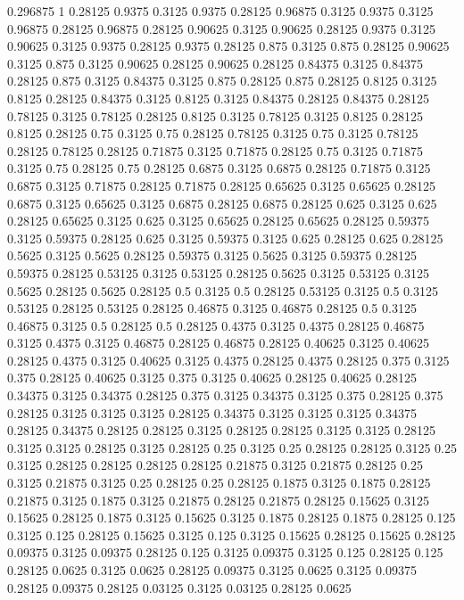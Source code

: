 0.296875 1
0.28125 0.9375
0.3125 0.9375
0.28125 0.96875
0.3125 0.9375
0.3125 0.96875
0.28125 0.96875
0.28125 0.90625
0.3125 0.90625
0.28125 0.9375
0.3125 0.90625
0.3125 0.9375
0.28125 0.9375
0.28125 0.875
0.3125 0.875
0.28125 0.90625
0.3125 0.875
0.3125 0.90625
0.28125 0.90625
0.28125 0.84375
0.3125 0.84375
0.28125 0.875
0.3125 0.84375
0.3125 0.875
0.28125 0.875
0.28125 0.8125
0.3125 0.8125
0.28125 0.84375
0.3125 0.8125
0.3125 0.84375
0.28125 0.84375
0.28125 0.78125
0.3125 0.78125
0.28125 0.8125
0.3125 0.78125
0.3125 0.8125
0.28125 0.8125
0.28125 0.75
0.3125 0.75
0.28125 0.78125
0.3125 0.75
0.3125 0.78125
0.28125 0.78125
0.28125 0.71875
0.3125 0.71875
0.28125 0.75
0.3125 0.71875
0.3125 0.75
0.28125 0.75
0.28125 0.6875
0.3125 0.6875
0.28125 0.71875
0.3125 0.6875
0.3125 0.71875
0.28125 0.71875
0.28125 0.65625
0.3125 0.65625
0.28125 0.6875
0.3125 0.65625
0.3125 0.6875
0.28125 0.6875
0.28125 0.625
0.3125 0.625
0.28125 0.65625
0.3125 0.625
0.3125 0.65625
0.28125 0.65625
0.28125 0.59375
0.3125 0.59375
0.28125 0.625
0.3125 0.59375
0.3125 0.625
0.28125 0.625
0.28125 0.5625
0.3125 0.5625
0.28125 0.59375
0.3125 0.5625
0.3125 0.59375
0.28125 0.59375
0.28125 0.53125
0.3125 0.53125
0.28125 0.5625
0.3125 0.53125
0.3125 0.5625
0.28125 0.5625
0.28125 0.5
0.3125 0.5
0.28125 0.53125
0.3125 0.5
0.3125 0.53125
0.28125 0.53125
0.28125 0.46875
0.3125 0.46875
0.28125 0.5
0.3125 0.46875
0.3125 0.5
0.28125 0.5
0.28125 0.4375
0.3125 0.4375
0.28125 0.46875
0.3125 0.4375
0.3125 0.46875
0.28125 0.46875
0.28125 0.40625
0.3125 0.40625
0.28125 0.4375
0.3125 0.40625
0.3125 0.4375
0.28125 0.4375
0.28125 0.375
0.3125 0.375
0.28125 0.40625
0.3125 0.375
0.3125 0.40625
0.28125 0.40625
0.28125 0.34375
0.3125 0.34375
0.28125 0.375
0.3125 0.34375
0.3125 0.375
0.28125 0.375
0.28125 0.3125
0.3125 0.3125
0.28125 0.34375
0.3125 0.3125
0.3125 0.34375
0.28125 0.34375
0.28125 0.28125
0.3125 0.28125
0.28125 0.3125
0.3125 0.28125
0.3125 0.3125
0.28125 0.3125
0.28125 0.25
0.3125 0.25
0.28125 0.28125
0.3125 0.25
0.3125 0.28125
0.28125 0.28125
0.28125 0.21875
0.3125 0.21875
0.28125 0.25
0.3125 0.21875
0.3125 0.25
0.28125 0.25
0.28125 0.1875
0.3125 0.1875
0.28125 0.21875
0.3125 0.1875
0.3125 0.21875
0.28125 0.21875
0.28125 0.15625
0.3125 0.15625
0.28125 0.1875
0.3125 0.15625
0.3125 0.1875
0.28125 0.1875
0.28125 0.125
0.3125 0.125
0.28125 0.15625
0.3125 0.125
0.3125 0.15625
0.28125 0.15625
0.28125 0.09375
0.3125 0.09375
0.28125 0.125
0.3125 0.09375
0.3125 0.125
0.28125 0.125
0.28125 0.0625
0.3125 0.0625
0.28125 0.09375
0.3125 0.0625
0.3125 0.09375
0.28125 0.09375
0.28125 0.03125
0.3125 0.03125
0.28125 0.0625
